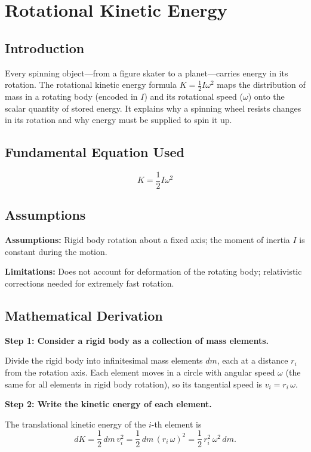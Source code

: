 \chapter{Rotational Kinetic Energy}

\section*{Introduction}

Every spinning object---from a figure skater to a planet---carries energy in its rotation. The rotational kinetic energy formula $K = \frac{1}{2}I\omega^2$ maps the distribution of mass in a rotating body (encoded in $I$) and its rotational speed ($\omega$) onto the scalar quantity of stored energy. It explains why a spinning wheel resists changes in its rotation and why energy must be supplied to spin it up.
\section*{Fundamental Equation Used}

\begin{equation}
K = \frac{1}{2}I\omega^2
\end{equation}
\section*{Assumptions}

\textbf{Assumptions:} Rigid body rotation about a fixed axis; the moment of inertia $I$ is constant during the motion.


\textbf{Limitations:} Does not account for deformation of the rotating body; relativistic corrections needed for extremely fast rotation.


\section*{Mathematical Derivation}

\textbf{Step 1: Consider a rigid body as a collection of mass elements.}

Divide the rigid body into infinitesimal mass elements $dm$, each at a distance $r_i$ from the rotation axis. Each element moves in a circle with angular speed $\omega$ (the same for all elements in rigid body rotation), so its tangential speed is $v_i = r_i\,\omega$.

\textbf{Step 2: Write the kinetic energy of each element.}

The translational kinetic energy of the $i$-th element is
\begin{equation}
dK = \frac{1}{2}\,dm\,v_i^2 = \frac{1}{2}\,dm\,(r_i\,\omega)^2 = \frac{1}{2}\,r_i^2\,\omega^2\,dm.
\end{equation}

